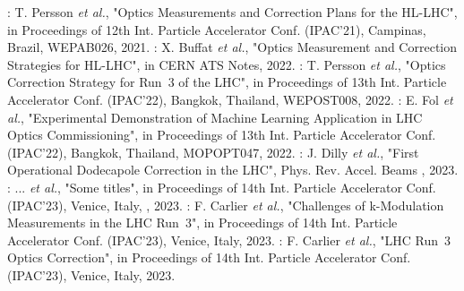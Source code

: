\begin{declaration}
\newline \newline
\noindent\cite{IPAC:Persson:Optics_Measurements_Correction_Plans_HLLHC}: T. Persson \textit{et al.}, "Optics Measurements and Correction Plans for the HL-LHC", in Proceedings of \num{12}th Int. Particle Accelerator Conf. (IPAC'21), Campinas, Brazil, WEPAB026, \num{2021}.
\newline \newline
\noindent\cite{REPORT:OMC:Optics_Strategy_HLLHC}: X. Buffat \textit{et al.}, "Optics Measurement and Correction Strategies for HL-LHC", in CERN ATS Notes, \num{2022}. 
\newline \newline
\noindent\cite{IPAC:Persson:Optics_Correction_Strategy_2022}: T. Persson \textit{et al.}, "Optics Correction Strategy for Run~\num{3} of the LHC", in Proceedings of \num{13}th Int. Particle Accelerator Conf. (IPAC'22), Bangkok, Thailand, WEPOST008, \num{2022}.
\newline \newline
\noindent\cite{IPAC:Fol:ML_Application_LHC_Optics_Commissioning}: E. Fol \textit{et al.}, "Experimental Demonstration of Machine Learning Application in LHC Optics Commissioning", in Proceedings of \num{13}th Int. Particle Accelerator Conf. (IPAC'22), Bangkok, Thailand, MOPOPT047, \num{2022}.
\newline \newline
\noindent{}: J. Dilly \textit{et al.}, "First Operational Dodecapole Correction in the LHC", Phys. Rev. Accel. Beams , \num{2023}.
\newline \newline
\noindent{}: ... \textit{et al.}, "Some titles", in Proceedings of \num{14}th Int. Particle Accelerator Conf. (IPAC'23), Venice, Italy, , \num{2023}.
\newline \newline
\noindent\cite{IPAC:Carlier:Challenges_kmodulation_LHC_Run3}: F. Carlier \textit{et al.}, "Challenges of k-Modulation Measurements in the LHC Run~3", in Proceedings of \num{14}th Int. Particle Accelerator Conf. (IPAC'23), Venice, Italy,  \num{2023}.
\newline \newline
\noindent\cite{IPAC:Carlier:LHC_Run3_Optics_Correction}: F. Carlier \textit{et al.}, "LHC Run~3 Optics Correction", in Proceedings of \num{14}th Int. Particle Accelerator Conf. (IPAC'23), Venice, Italy,  \num{2023}.
\end{declaration}

\cleardoublepage